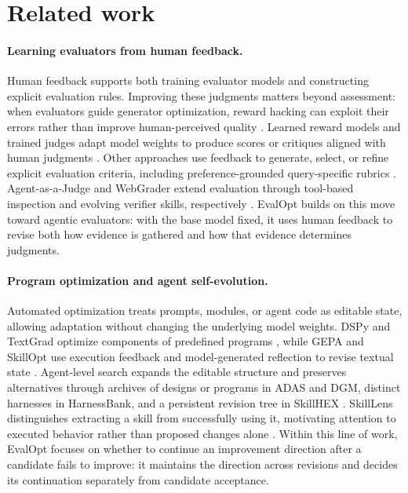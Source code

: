 \section{Related work}
\label{sec:related}

\paragraph{Learning evaluators from human feedback.}
Human feedback supports both training evaluator models and constructing explicit evaluation rules.
Improving these judgments matters beyond assessment: when evaluators guide generator optimization, reward hacking can exploit their errors rather than improve human-perceived quality \citep{wang2026rewardhacking}.
Learned reward models and trained judges adapt model weights to produce scores or critiques aligned with human judgments \citep{xu2023imagereward,kim2024prometheus,ke2024critiquellm}.
Other approaches use feedback to generate, select, or refine explicit evaluation criteria, including preference-grounded query-specific rubrics \citep{shankar2024spade,liu2024autocalibrate,shankar2024evalgen,lv2026queryrubrics}.
Agent-as-a-Judge and WebGrader extend evaluation through tool-based inspection and evolving verifier skills, respectively \citep{zhuge2025agentjudge,chen2026webgrader}.
EvalOpt builds on this move toward agentic evaluators: with the base model fixed, it uses human feedback to revise both how evidence is gathered and how that evidence determines judgments.

\paragraph{Program optimization and agent self-evolution.}
Automated optimization treats prompts, modules, or agent code as editable state, allowing adaptation without changing the underlying model weights.
DSPy and TextGrad optimize components of predefined programs \citep{khattab2024dspy,yuksekgonul2025textgrad}, while GEPA and SkillOpt use execution feedback and model-generated reflection to revise textual state \citep{agrawal2026gepa,yang2026skillopt}.
Agent-level search expands the editable structure and preserves alternatives through archives of designs or programs in ADAS and DGM, distinct harnesses in HarnessBank, and a persistent revision tree in SkillHEX \citep{hu2025adas,zhang2025dgm,luo2026harnessbank,feng2026skillhex}.
SkillLens distinguishes extracting a skill from successfully using it, motivating attention to executed behavior rather than proposed changes alone \citep{huang2026skillconsumption}.
Within this line of work, EvalOpt focuses on whether to continue an improvement direction after a candidate fails to improve: it maintains the direction across revisions and decides its continuation separately from candidate acceptance.

